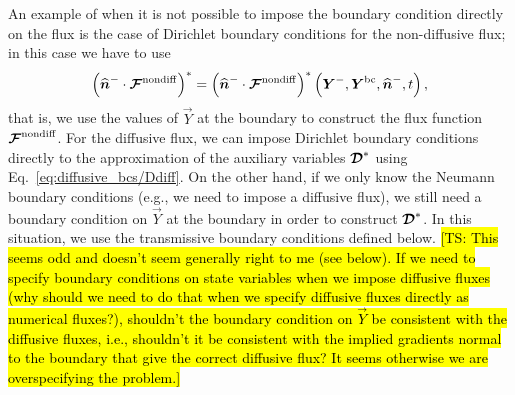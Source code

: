 \documentclass{report}
\begin{document}
An example of when it is not possible to impose the boundary condition directly on the flux is the case of Dirichlet boundary conditions for the non-diffusive flux; in this case we have to use  
\begin{equation}
\left( \widehat{\boldsymbol{{n}}}^{-} \cdot \boldsymbol{{\mathcal{F}}}^{\mathrm{nondiff}}\right)^{*} =
  \left( \widehat{\boldsymbol{{n}}}^{-} \cdot \boldsymbol{{\mathcal{F}}}^{\mathrm{nondiff}}\right)^{*}
  \left(\boldsymbol{{Y}}^{-}, \boldsymbol{{Y}}^{\rm bc}, \widehat{\boldsymbol{{n}}}^{-}, t\right)
  \label{eq:nondiffusive_bcs},
\end{equation}
that is, we use the values of $\vec{Y}$ at the boundary to construct the flux function $\boldsymbol{{\mathcal{F}}}^{\mathrm{nondiff}}$.
 For the diffusive flux, we can impose Dirichlet boundary conditions directly to the approximation of the auxiliary variables $\boldsymbol{{\mathcal{D}}}^{*}$ using Eq.\ \eqref{eq:diffusive_bcs/Ddiff}. On the other hand, if we only know the Neumann boundary conditions (e.g., we need to impose a diffusive flux), we still need a boundary condition on $\vec{Y}$ at the boundary in order to construct $\boldsymbol{{\mathcal{D}}}^{*}$. In this situation, we use the transmissive boundary conditions defined below. \hl{[TS: This seems odd and doesn't seem generally right to me (see below). If we need to specify boundary conditions on state variables when we impose diffusive fluxes (why should we need to do that when we specify diffusive fluxes directly as numerical fluxes?), shouldn't the boundary condition on $\vec{Y}$ be consistent with the diffusive fluxes, i.e., shouldn't it be consistent with the implied gradients normal to the boundary that give the correct diffusive flux? It seems otherwise we are overspecifying the problem.]}
\end{document}
